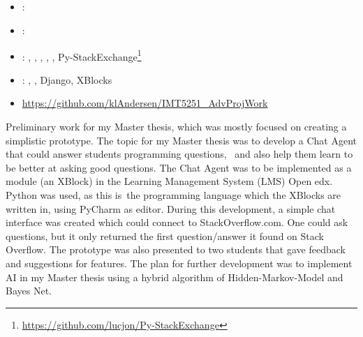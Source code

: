 \subsection[Advanced Project Work]{}
\label{sec:adv_proj_work}
\begin{itemize} 
	\item {}: 
	\item {}: 
	\item {}: , , , , , 
	Py-StackExchange\footnote{\url{https://github.com/lucjon/Py-StackExchange}}
	\item {}: , , Django, XBlocks
	\item {} \url{https://github.com/klAndersen/IMT5251_AdvProjWork}
\end{itemize} 
Preliminary work for my Master thesis, which was mostly focused on creating a simplistic prototype. 
The topic for my Master thesis was to develop a Chat Agent that could answer students programming questions,  and also help them learn to be better at asking good questions. 
The Chat Agent was to be implemented as a module (an XBlock) in the Learning Management System (LMS) Open edx. 
Python was used, as this is the programming language which the XBlocks are written in, using  PyCharm as editor. 
\vspace{0.5em}\newline
During this development, a simple chat interface was created which could connect to StackOverflow.com. 
One could ask questions, but it only returned the first question/answer it found on Stack Overflow. 
The prototype was also presented to two students that gave feedback and suggestions for features. 
The plan for further development was to implement AI in my Master thesis using a hybrid algorithm of Hidden-Markov-Model and Bayes Net. 

